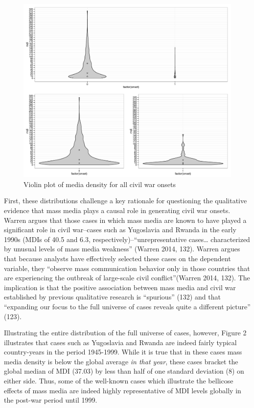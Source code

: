 \documentclass[11pt,article,oneside]{memoir}
\makeatletter
\def\maxwidth{\ifdim\Gin@nat@width>\linewidth\linewidth
\else\Gin@nat@width\fi}
\let\Oldincludegraphics\includegraphics
\renewcommand{\includegraphics}[1]{\Oldincludegraphics[width=\maxwidth]{#1}}
\makeatother
\begin{document}
\begin{figure}[htbp]
\centering
\includegraphics{./media_civil_war_files/figure-markdown/violinplot.pdf}
\caption{Violin plot of media density for all civil war onsets}
\end{figure}

First, these distributions challenge a key rationale for questioning the
qualitative evidence that mass media plays a causal role in generating
civil war onsets. Warren argues that those cases in which mass media are
known to have played a significant role in civil war--cases such as
Yugoslavia and Rwanda in the early 1990s (MDIs of 40.5 and 6.3,
respectively)--``unrepresentative cases\ldots{} characterized by unusual
levels of mass media weakness'' (Warren 2014, 132). Warren argues that
because analysts have effectively selected these cases on the dependent
variable, they ``observe mass communication behavior only in those
countries that are experiencing the outbreak of large-scale civil
conflict''(Warren 2014, 132). The implication is that the positive
association between mass media and civil war established by previous
qualitative research is ``spurious'' (132) and that ``expanding our
focus to the full universe of cases reveals quite a different picture''
(123).

Illustrating the entire distribution of the full universe of cases,
however, Figure 2 illustrates that cases such as Yugoslavia and Rwanda
are indeed fairly typical country-years in the period 1945-1999. While
it is true that in these cases mass media density is below the global
average \emph{in that year}, these cases bracket the global median of
MDI (37.03) by less than half of one standard deviation (8) on either
side. Thus, some of the well-known cases which illustrate the bellicose
effects of mass media are indeed highly representative of MDI levels
globally in the post-war period until 1999.
\end{document}
